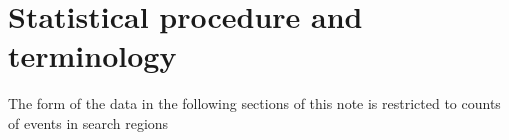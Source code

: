 \section{Statistical procedure and terminology}


The form of the data  
in the following sections of this note is restricted to counts of events in search regions 



